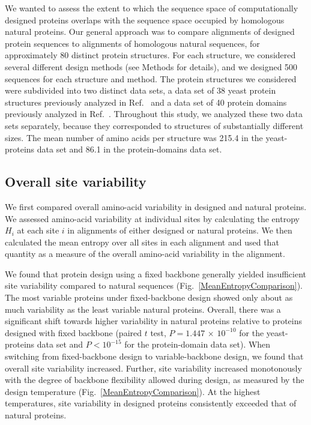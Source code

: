 \documentclass[12pt]{article}
\begin{document}
We wanted to assess the extent to which the sequence space of computationally designed proteins overlaps with the sequence space occupied by homologous natural proteins. Our general approach was to compare alignments of designed protein sequences to alignments of homologous natural sequences, for approximately 80 distinct protein structures. For each structure, we considered several different design methods (see Methods for details), and we designed 500 sequences for each structure and method. The protein structures we considered were subdivided into two distinct data sets, a data set of 38 yeast protein structures previously analyzed in Ref.\ \cite{Ramsey2011} and a data set of 40 protein domains previously analyzed in  Ref.\ \cite{OllikainenKortemme}. Throughout this study, we analyzed these two data sets separately, because they corresponded to structures of substantially different sizes. The mean number of amino acids per structure was 215.4 in the yeast-proteins data set and 86.1 in the protein-domains data set.

\subsection{Overall site variability}
\label{SiteVariability}

We first compared overall amino-acid variability in designed and natural proteins. We assessed amino-acid variability at individual sites by calculating the entropy $H_i$ at each site $i$ in alignments of either designed or natural proteins. We then calculated the mean entropy over all sites in each alignment and used that quantity as a measure of the overall amino-acid variability in the alignment.

We found that protein design using a fixed backbone generally yielded insufficient site variability compared to natural sequences (Fig.~\ref{MeanEntropyComparison}). The most variable proteins under fixed-backbone design showed only about as much variability as the least variable natural proteins. Overall, there was a significant shift towards higher variability in natural proteins relative to proteins designed with fixed backbone (paired $t$ test, $P = 1.447 $ $\times$  $10^{-10}$ for the yeast-proteins data set and $P<10^{-15}$ for the protein-domain data set). When switching from fixed-backbone design to variable-backbone design, we found that overall site variability increased. Further, site variability increased monotonously with the degree of backbone flexibility allowed during design, as measured by the design temperature (Fig.~\ref{MeanEntropyComparison}). At the highest temperatures, site variability in designed proteins consistently exceeded that of natural proteins. 
\end{document}
